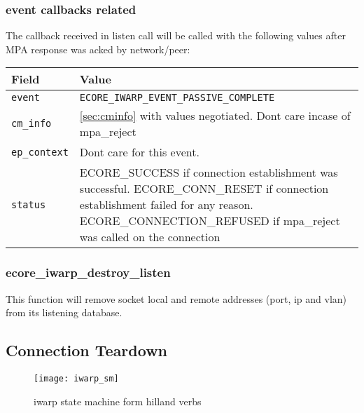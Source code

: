 \documentclass[11pt,fleqn,hidelinks,oneside]{book} %
\begin{document}
\subsubsection{event callbacks related}
The callback received in listen call will be called with the following values after MPA response was acked by network/peer: \newline
\begin{tabular}{| l | p{10cm} |}
	\hline
	\textbf{Field} & \textbf{Value} \\ \hline
	\texttt{event} & \texttt{ECORE\_IWARP\_EVENT\_PASSIVE\_COMPLETE} \\ \hline
	\texttt{cm\_info} & \ref{sec:cminfo} with values negotiated. Dont care incase of mpa\_reject \\ \hline
	\texttt{ep\_context} & Dont care for this event. \\ \hline
	\texttt{status} & ECORE\_SUCCESS if connection establishment was successful. ECORE\_CONN\_RESET if connection establishment failed for any reason. ECORE\_CONNECTION\_REFUSED if mpa\_reject was called on the connection\\ \hline
\end{tabular}

\subsubsection{ecore\_iwarp\_destroy\_listen}
This function will remove socket local and remote addresses (port, ip and vlan) from its listening database.


\subsection{Connection Teardown}
\label{sec:iwarp_teardown}

\begin{figure}[h]
	\centering
	\texttt{[image: iwarp\_sm]}
	\caption{iwarp state machine form hilland verbs}
	\label{fig:iwarp_sm}
\end{figure}
\end{document}
